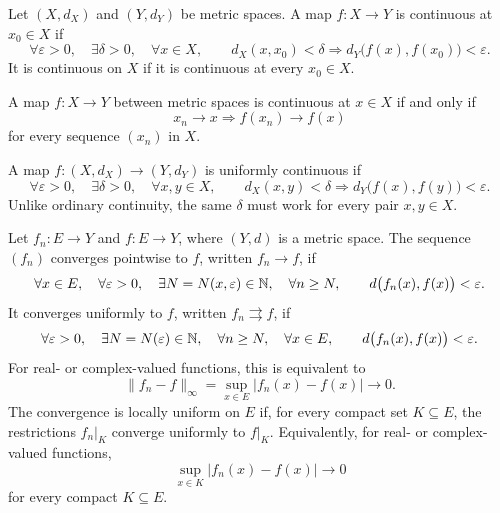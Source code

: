     \begin{definition}
        Let $(X,d_X)$ and $(Y,d_Y)$ be metric spaces. A map $f\colon X\to Y$ is
        continuous at $x_0\in X$ if
        \[
            \forall\varepsilon>0,
            \quad
            \exists\delta>0,
            \quad
            \forall x\in X,
            \qquad
            d_X(x,x_0)<\delta
            \Rightarrow
            d_Y\bigl(f(x),f(x_0)\bigr)<\varepsilon.
        \]
        It is continuous on $X$ if it is continuous at every $x_0\in X$.
    \end{definition}

    \begin{theorem}
        A map $f\colon X\to Y$ between metric spaces is continuous at $x\in X$ if
        and only if
        \[
            x_n\to x
            \Rightarrow
            f(x_n)\to f(x)
        \]
        for every sequence $(x_n)$ in $X$.
    \end{theorem}

    \begin{definition}
        A map $f\colon (X,d_X)\to(Y,d_Y)$ is uniformly continuous if
        \[
            \forall\varepsilon>0,
            \quad
            \exists\delta>0,
            \quad
            \forall x,y\in X,
            \qquad
            d_X(x,y)<\delta
            \Rightarrow
            d_Y\bigl(f(x),f(y)\bigr)<\varepsilon.
        \]
        Unlike ordinary continuity, the same $\delta$ must work for every pair
        $x,y\in X$.
    \end{definition}

    \begin{definition}
        Let $f_n\colon E\to Y$ and $f\colon E\to Y$, where $(Y,d)$ is a metric space. The
        sequence $(f_n)$ converges pointwise to $f$, written
        $f_n\to f$, if
        \[
            \forall x\in E,
            \quad
            \forall\varepsilon>0,
            \quad
            \exists N=N(x,\varepsilon)\in\mathbb{N},
            \quad
            \forall n\geq N,
            \qquad
            d\bigl(f_n(x),f(x)\bigr)<\varepsilon.
        \]
        It converges uniformly to $f$, written $f_n\rightrightarrows f$, if
        \[
            \forall\varepsilon>0,
            \quad
            \exists N=N(\varepsilon)\in\mathbb{N},
            \quad
            \forall n\geq N,
            \quad
            \forall x\in E,
            \qquad
            d\bigl(f_n(x),f(x)\bigr)<\varepsilon.
        \]
        For real- or complex-valued functions, this is equivalent to
        \[
            \|f_n-f\|_\infty
            =
            \sup_{x\in E}|f_n(x)-f(x)|
            \longrightarrow 0.
        \]
        The convergence is locally uniform on $E$ if, for every compact set
        $K\subseteq E$, the restrictions $f_n|_K$ converge uniformly to $f|_K$.
        Equivalently, for real- or complex-valued functions,
        \[
            \sup_{x\in K}|f_n(x)-f(x)|
            \longrightarrow 0
        \]
        for every compact $K\subseteq E$.
    \end{definition}

